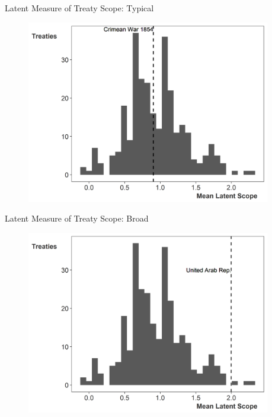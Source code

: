 \documentclass{beamer}
\begin{document}

\begin{frame}{Latent Measure of Treaty Scope: Typical}

\begin{figure}[htbp]
	\centering
		\includegraphics[width=0.95\textwidth]{ls-hist-median.png}
\end{figure}


\end{frame} 


\begin{frame}{Latent Measure of Treaty Scope: Broad}

\begin{figure}[htbp]
	\centering
		\includegraphics[width=0.95\textwidth]{ls-hist-broad.png}
\end{figure}


\end{frame} 
\end{document}
